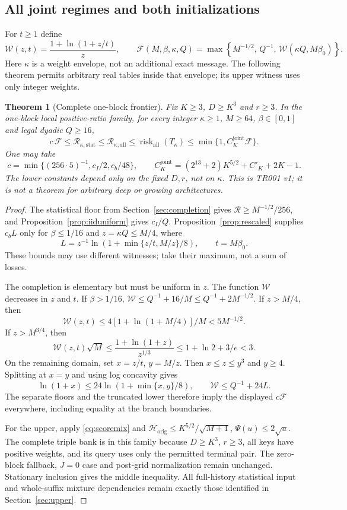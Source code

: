 \documentclass[11pt,letterpaper]{article}
\newtheorem{theorem}{Theorem}[section]
\theoremstyle{definition}\newtheorem{definition}[theorem]{Definition}
\theoremstyle{remark}\newtheorem{remark}[theorem]{Remark}
\newcommand{\betaz}{\beta_0}
\newcommand{\Risk}{\mathcal{R}}
\newcommand{\unit}[1]{\textsf{#1}}
\begin{document}
\subsection{All joint regimes and both initializations}
For $t\ge1$ define
\[
 \mathcal W(z,t)=\frac{1+\ln(1+z/t)}{z},\qquad
 \mathcal F(M,\beta,\kappa,Q)
 =\max\left\{M^{-1/2},\,Q^{-1},\,\mathcal W(\kappa Q,M\betaz)\right\}.
\]
Here $\kappa$ is a weight envelope, not an additional exact message. The following theorem permits arbitrary real tables inside that envelope; its upper witness uses only integer weights.
\begin{theorem}[Complete one-block frontier]\label{thm:joint}
Fix $K\ge3$, $D\ge K^3$ and $r\ge3$. In the one-block local positive-ratio family, for every integer $\kappa\ge1$, $M\ge64$, $\beta\in[0,1]$ and legal dyadic $Q\ge16$,
\begin{equation}\label{eq:joint}
 c\,\mathcal F\le\Risk_{\kappa,\mathrm{stat}}
 \le\Risk_{\kappa,\mathrm{all}}
 \le\operatorname{risk}_{\mathrm{all}}(T_\kappa)
 \le\min\{1,C_K^{\mathrm{joint}}\mathcal F\}.
\end{equation}
One may take
\[
 c=\min\{(256\cdot5)^{-1},c_I/2,c_b/48\},\qquad
 C_K^{\mathrm{joint}}=(2^{13}+2)K^{5/2}+C'_K+2K-1.
\]
The lower constants depend only on the fixed $D,r$, not on $\kappa$. This is \unit{TR001 v1}; it is not a theorem for arbitrary deep or growing architectures.
\end{theorem}
\begin{proof}
The statistical floor from Section~\ref{sec:completion} gives $\Risk\ge M^{-1/2}/256$, and Proposition~\ref{prop:iiduniform} gives $c_I/Q$. Proposition~\ref{prop:rescaled} supplies $c_bL$ only for $\beta\le1/16$ and $z=\kappa Q\le M/4$, where
\[
 L=z^{-1}\ln(1+\min\{z/t,M/z\}/8),\qquad t=M\betaz.
\]
These bounds may use different witnesses; take their maximum, not a sum of losses.

The completion is elementary but must be uniform in $z$. The function $\mathcal W$ decreases in $z$ and $t$. If $\beta>1/16$,
$\mathcal W\le Q^{-1}+16/M\le Q^{-1}+2M^{-1/2}$.
If $z>M/4$, then
\[
 \mathcal W(z,t)\le4[1+\ln(1+M/4)]/M<5M^{-1/2}.
\]
If $z>M^{3/4}$, then
\[
 \mathcal W(z,t)\sqrt M
 \le\frac{1+\ln(1+z)}{z^{1/3}}
 \le1+\ln2+3/e<3.
\]
On the remaining domain, set $x=z/t$, $y=M/z$. Then $x\le z\le y^3$ and $y\ge4$. Splitting at $x=y$ and using log concavity gives
\[
 \ln(1+x)\le24\ln(1+\min\{x,y\}/8),\qquad
 \mathcal W\le Q^{-1}+24L.
\]
The separate floors and the truncated lower therefore imply the displayed $c\mathcal F$ everywhere, including equality at the branch boundaries.

For the upper, apply \eqref{eq:scoremix} and
$\mathcal H_{\mathrm{orig}}\le K^{5/2}/\sqrt{M+1}$,
$\Psi(u)\le2\sqrt u$. The complete triple bank is in this family because $D\ge K^3$, $r\ge3$, all keys have positive weights, and its query uses only the permitted terminal pair. The zero-block fallback, $J=0$ case and post-grid normalization remain unchanged. Stationary inclusion gives the middle inequality. All full-history statistical input and whole-suffix mixture dependencies remain exactly those identified in Section~\ref{sec:upper}.
\end{proof}
\end{document}
